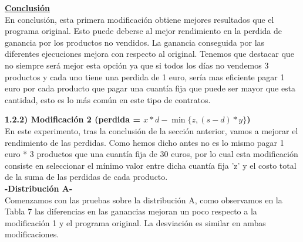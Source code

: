 \documentclass{article}
\begin{document}
	\vspace{1cm}

	\underline{\textbf{Conclusión}} \\
	
	 En conclusión, esta primera modificación obtiene mejores resultados que el programa original. Esto puede deberse al mejor rendimiento en la perdida de ganancia por los productos no vendidos. La ganancia conseguida por las diferentes ejecuciones mejora con respecto al original. Tenemos que destacar que no siempre será mejor esta opción ya que si todos los días no vendemos 3 productos y cada uno tiene una perdida de 1 euro, sería mas eficiente pagar 1 euro por cada producto que pagar una cuantía fija que puede ser mayor que esta cantidad, esto es lo más común en este tipo de contratos.



\newpage
	
	\normalsize \textbf{1.2.2) Modificación 2 (perdida = $x * d-\min \{z,(s-d) * y\}$)} \\
	
	En este experimento, tras la conclusión de la sección anterior, vamos a mejorar el rendimiento de las perdidas. Como hemos dicho antes no es lo mismo pagar 1 euro * 3 productos que una cuantía fija de 30 euros, por lo cual esta modificación consiste en seleccionar el mínimo valor entre dicha cuantía fija 'z' y el costo total de la suma de las perdidas de cada producto. \\
	
	\textbf{-Distribución A-} \\
	
	Comenzamos con las pruebas sobre la distribución A, como observamos en la Tabla 7 las diferencias en las ganancias mejoran un poco respecto a la modificación 1 y el programa original. La desviación es similar en ambas modificaciones.
	
\end{document}
